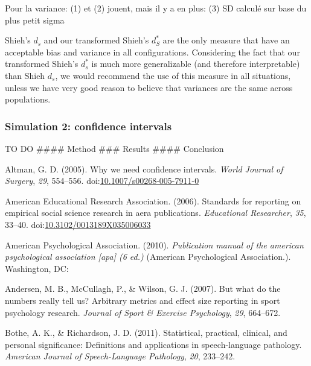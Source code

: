 \documentclass[
  man,floatsintext]{apa6}
\begin{document}
Pour la variance:
(1) et (2) jouent, mais il y a en plus:
(3) SD calculé sur base du plus petit sigma

Shieh's \(d_s\) and our transformed Shieh's \(d^*_S\) are the only measure that have an acceptable bias and variance in all configurations. Considering the fact that our transformed Shieh's \(d^*_s\) is much more generalizable (and therefore interpretable) than Shieh \(d_s\), we would recommend the use of this measure in all situations, unless we have very good reason to believe that variances are the same across populations.

\hypertarget{simulation-2-confidence-intervals}{%
\subsubsection{Simulation 2: confidence intervals}\label{simulation-2-confidence-intervals}}

TO DO
\#\#\#\# Method
\#\#\# Results
\#\#\#\# Conclusion

\hypertarget{refs}{}
\leavevmode\hypertarget{ref-Altman_2005}{}%
Altman, G. D. (2005). Why we need confidence intervals. \emph{World Journal of Surgery}, \emph{29}, 554--556. doi:\href{https://doi.org/10.1007/s00268-005-7911-0}{10.1007/s00268-005-7911-0}

\leavevmode\hypertarget{ref-AERA_2006}{}%
American Educational Research Association. (2006). Standards for reporting on empirical social science research in aera publications. \emph{Educational Researcher}, \emph{35}, 33--40. doi:\href{https://doi.org/10.3102/0013189X035006033}{10.3102/0013189X035006033}

\leavevmode\hypertarget{ref-APA_2010}{}%
American Psychological Association. (2010). \emph{Publication manual of the american psychological association {[}apa{]} (6 ed.)} (American Psychological Association.). Washington, DC:

\leavevmode\hypertarget{ref-Andersen_et_al_2007}{}%
Andersen, M. B., McCullagh, P., \& Wilson, G. J. (2007). But what do the numbers really tell us? Arbitrary metrics and effect size reporting in sport psychology research. \emph{Journal of Sport \& Exercise Psychology}, \emph{29}, 664--672.

\leavevmode\hypertarget{ref-Bothe_Richardson_2011}{}%
Bothe, A. K., \& Richardson, J. D. (2011). Statistical, practical, clinical, and personal significance: Definitions and applications in speech-language pathology. \emph{American Journal of Speech-Language Pathology}, \emph{20}, 233--242.
\end{document}
